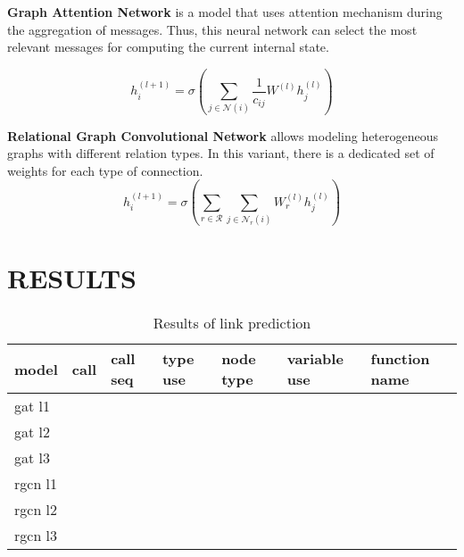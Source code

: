 \documentclass[a4paper,twoside]{article}
\begin{document}
\textbf{Graph Attention Network} is a model that uses attention mechanism during the aggregation of messages. Thus, this neural network can select the most relevant messages for computing the current internal state.

$$
h_i^{(l+1)}=\sigma\left(\sum_{j\in \mathcal{N}(i)} {\frac{1}{c_{ij}} W^{(l)}h^{(l)}_j}\right)
$$

\textbf{Relational Graph Convolutional Network} allows modeling heterogeneous graphs with different relation types. In this variant, there is a dedicated set of weights for each type of connection. 
$$
h_i^{(l+1)} = \sigma\left(\sum_{r\in \mathcal{R}}
\sum_{j\in\mathcal{N}_r(i)}W_r^{(l)}h_j^{(l)}\right)
$$





\section{\uppercase{Results}}

\begin{table*}[]
\centering
\label{tbl:results}
\caption{Results of link prediction}
\begin{tabular}{lllllll}
model   & call & call seq & type use & node type & variable use & function name \\ \hline
gat l1  &      &          &          &           &              &               \\
gat l2  &      &          &          &           &              &               \\
gat l3  &      &          &          &           &              &               \\
rgcn l1 &      &          &          &           &              &               \\
rgcn l2 &      &          &          &           &              &               \\
rgcn l3 &      &          &          &           &              &              
\end{tabular}
\end{table*}



{\small
}
\end{document}
